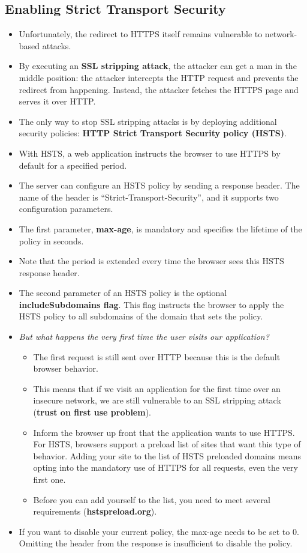 \documentclass[../main.tex]{subfiles}
\begin{document}
\subsection{Enabling Strict Transport Security}
\begin{itemize}
\item Unfortunately, the redirect to HTTPS itself remains vulnerable to network-based attacks.
\item By executing an \textbf{SSL stripping attack}, the attacker can get a man in the middle position: the attacker intercepts the HTTP request and prevents the redirect from happening. Instead, the attacker fetches the HTTPS page and serves it over HTTP.
\item The only way to stop SSL stripping attacks is by deploying additional security policies: \textbf{HTTP Strict Transport Security policy (HSTS)}.
\item With HSTS, a web application instructs the browser to use HTTPS by default for a specified period.
\item The server can configure an HSTS policy by sending a response header. The name of the header is “Strict-Transport-Security”, and it supports two configuration parameters. 
\item The first parameter, \textbf{max-age}, is mandatory and specifies the lifetime of the policy in seconds.
\item Note that the period is extended every time the browser sees this HSTS response header.
\item The second parameter of an HSTS policy is the optional \textbf{includeSubdomains flag}. This flag instructs the browser to apply the HSTS policy to all subdomains of the domain that sets the policy.
\item \emph{But what happens the very first time the user visits our application?}
\begin{itemize}
\item The first request is still sent over HTTP because this is the default browser behavior.
\item This means that if we visit an application for the first time over an insecure network, we are still vulnerable to an SSL stripping attack (\textbf{trust on first use problem}).
\item Inform the browser up front that the application wants to use HTTPS. For HSTS, browsers support a preload list of sites that want this type of behavior. Adding your site to the list of HSTS preloaded domains means opting into the mandatory use of HTTPS for all requests, even the very first one.
\item Before you can add yourself to the list, you need to meet several requirements (\textbf{hstspreload.org}).
\end{itemize}
\item If you want to disable your current policy, the max-age needs to be set to 0. Omitting the header from the response is insufficient to disable the policy.
\end{itemize}
\clearpage
\end{document}
